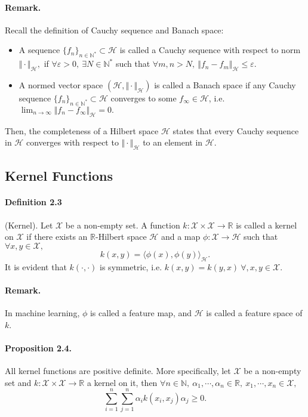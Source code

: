 \documentclass{article}
\begin{document}
\paragraph{Remark.} Recall the definition of Cauchy sequence and Banach space:
\begin{itemize}
	\item A sequence $\lbrace f_n\rbrace_{n\in\mathbb{N}^*}\subset\mathcal{H}$ is called a Cauchy sequence with respect to norm $\Vert\cdot\Vert_\mathcal{H},$ if $\forall \varepsilon > 0,\ \exists N\in\mathbb{N}^{*}$ such that $\forall m,n > N,\ \Vert f_n - f_m\Vert_\mathcal{H}\leq\varepsilon$.
	\item A normed vector space $(\mathcal{H},\Vert\cdot\Vert_\mathcal{H})$ is called a Banach space if any Cauchy sequence $\lbrace f_n\rbrace_{n\in\mathbb{N}^*}\subset\mathcal{H}$ converges to some $f_\infty\in\mathcal{H}$, i.e. $\lim_{n\to\infty}\Vert f_n - f_\infty\Vert_\mathcal{H}=0.$
\end{itemize} 
Then, the completeness of a Hilbert space $\mathcal{H}$ states that every Cauchy sequence in $\mathcal{H}$ converges with respect to $\Vert\cdot\Vert_\mathcal{H}$ to an element in $\mathcal{H}$. 

\subsection{Kernel Functions}
\paragraph{Definition 2.3} (Kernel). Let $\mathcal{X}$ be a non-empty set. A function $k:\mathcal{X}\times\mathcal{X}\to\mathbb{R}$ is called a kernel on $\mathcal{X}$ if there exists an $\mathbb{R}$-Hilbert space $\mathcal{H}$ and a map $\phi:\mathcal{X}\to\mathcal{H}$ such that $\forall x,y\in\mathcal{X},$
\begin{equation*}
	k(x,y) = \langle\phi(x),\phi(y)\rangle_\mathcal{H}.\tag{2.1}
\end{equation*}
It is evident that $k(\cdot,\cdot)$ is symmetric, i.e. $k(x,y)=k(y,x)\ \forall,x,y\in\mathcal{X}$.
\paragraph{Remark.} In machine learning, $\phi$ is called a feature map, and $\mathcal{H}$ is called a feature space of $k$.

\paragraph{Proposition 2.4.} All kernel functions are positive definite. More specifically, let $\mathcal{X}$ be a non-empty set and $k:\mathcal{X}\times\mathcal{X}\to\mathbb{R}$ a kernel on it, then $\forall n\in\mathbb{N},\ \alpha_1,\cdots,\alpha_n\in\mathbb{R},\ x_1,\cdots,x_n\in\mathcal{X},$
\begin{equation*}
	\sum_{i=1}^n\sum_{j=1}^n \alpha_i k(x_i,x_j)\alpha_j\geq 0.\tag{2.2}
\end{equation*}
\end{document}
